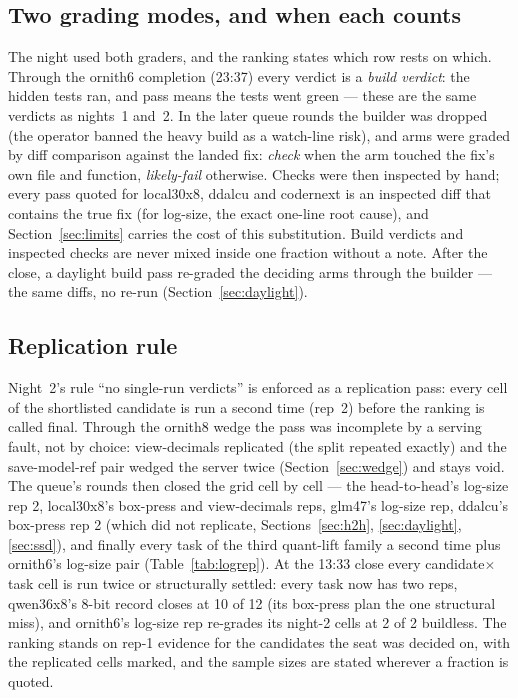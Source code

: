 \subsection{Two grading modes, and when each counts}\label{sec:grading}

The night used both graders, and the ranking states which row rests on which. Through the ornith6 completion
(23:37) every verdict is a \emph{build verdict}: the hidden tests ran, and pass means the tests went green ---
these are the same verdicts as nights~1 and~2. In the later queue rounds the builder was dropped (the operator
banned the heavy build as a watch-line risk), and arms were graded by diff comparison against the landed fix:
\emph{check} when the arm touched the fix's own file and function, \emph{likely-fail} otherwise. Checks were then
inspected by hand; every pass quoted for local30x8, ddalcu and codernext is an inspected diff that contains the
true fix (for log-size, the exact one-line root cause), and Section~\ref{sec:limits} carries the cost of this
substitution. Build verdicts and inspected checks are never mixed inside one fraction without a note. After the
close, a daylight build pass re-graded the deciding arms through the builder --- the same diffs, no re-run
(Section~\ref{sec:daylight}).

\subsection{Replication rule}

Night~2's rule ``no single-run verdicts'' is enforced as a replication pass: every cell of the shortlisted
candidate is run a second time (rep~2) before the ranking is called final. Through the ornith8 wedge the pass
was incomplete by a serving fault, not by choice: view-decimals replicated (the split repeated exactly) and the
save-model-ref pair wedged the server twice (Section~\ref{sec:wedge}) and stays void. The queue's rounds then
closed the grid cell by cell --- the head-to-head's log-size rep 2, local30x8's box-press and view-decimals
reps, glm47's log-size rep, ddalcu's box-press rep 2 (which did not replicate,
Sections~\ref{sec:h2h}, \ref{sec:daylight}, \ref{sec:ssd}), and finally every task of the third quant-lift
family a second time plus ornith6's log-size pair (Table~\ref{tab:logrep}). At the 13:33 close every
candidate$\times$task cell is run twice or structurally settled: every task now has two reps, qwen36x8's
8-bit record closes at 10 of 12 (its box-press plan the one structural miss), and ornith6's log-size rep
re-grades its night-2 cells at 2 of 2 buildless. The ranking stands on rep-1 evidence for the candidates the
seat was decided on, with the replicated cells marked, and the sample sizes are stated wherever a fraction is
quoted.

